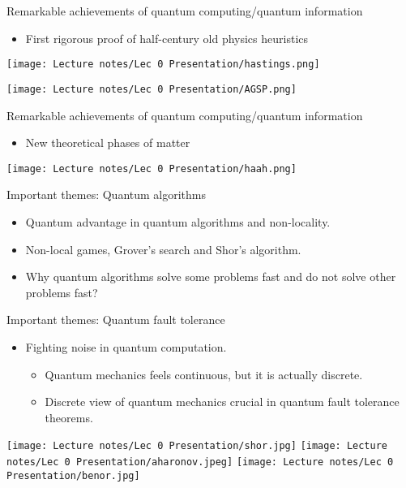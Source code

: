 \documentclass{beamer}
\theoremstyle{mystyle}
\newcommand {\beit}{\begin{itemize}}
\newcommand {\enit}{\end{itemize}}
\begin{document}
\begin{frame}{Remarkable achievements of quantum computing/quantum information}

\begin{itemize}
    \item First rigorous proof of half-century old physics heuristics
\end{itemize}

\texttt{[image: Lecture notes/Lec 0 Presentation/hastings.png]}

\texttt{[image: Lecture notes/Lec 0 Presentation/AGSP.png]}


    
\end{frame}

\begin{frame}{Remarkable achievements of quantum computing/quantum information}

\begin{itemize}
    \item New theoretical phases of matter
\end{itemize}

\texttt{[image: Lecture notes/Lec 0 Presentation/haah.png]}
    
\end{frame}

\begin{frame}{Important themes: Quantum algorithms}

\begin{itemize}
    \item Quantum advantage in quantum algorithms and non-locality.
    \item Non-local games, Grover's search and Shor's algorithm. 
    \item Why quantum algorithms solve some problems fast and do not solve other problems fast?
\end{itemize}


    
\end{frame}


\begin{frame}{Important themes: Quantum fault tolerance}

\begin{itemize}
    \item Fighting noise in quantum computation.
    \beit
    \pause
    \item Quantum mechanics feels continuous, but it is actually discrete.
    \pause
    \item Discrete view of quantum mechanics crucial in quantum fault tolerance theorems.
    \enit
\end{itemize}

\pause

\vspace{0.1in}

\centering

\texttt{[image: Lecture notes/Lec 0 Presentation/shor.jpg]}
\texttt{[image: Lecture notes/Lec 0 Presentation/aharonov.jpeg]}
\texttt{[image: Lecture notes/Lec 0 Presentation/benor.jpg]}
    
\end{frame}
\end{document}
